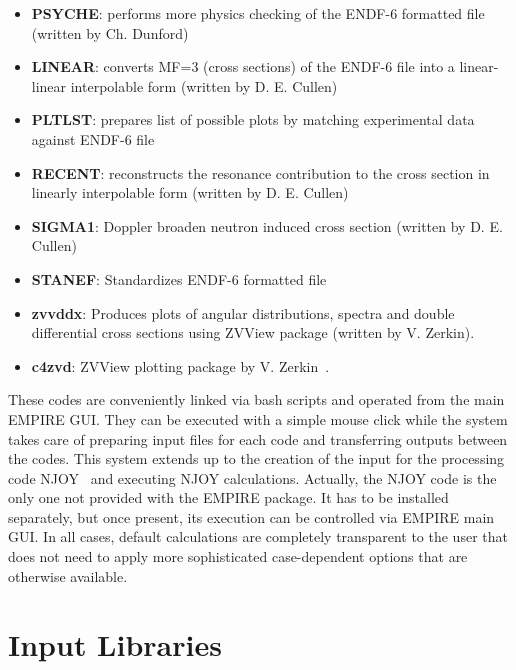 \begin{itemize}
\item \textbf{PSYCHE}: performs more physics checking of the ENDF-6
formatted file (written by Ch. Dunford)

\item \textbf{LINEAR}: converts MF=3 (cross sections) of the ENDF-6 file
into a linear-linear interpolable form (written by D. E. Cullen)~\cite%
{PREPRO}

\item \textbf{PLTLST}: prepares list of possible plots by matching
experimental data against ENDF-6 file

\item \textbf{RECENT}: reconstructs the resonance contribution to the cross
section in linearly interpolable form (written by D. E. Cullen)~\cite{PREPRO}

\item \textbf{SIGMA1}: Doppler broaden neutron induced cross section
(written by D. E. Cullen)~\cite{PREPRO}

\item \textbf{STANEF}: Standardizes ENDF-6 formatted file

\item \textbf{zvvddx}: Produces plots of angular distributions, spectra and
double differential cross sections using ZVView package (written by V.
Zerkin).

\item \textbf{c4zvd}: ZVView\textbf{%
} plotting package by V. Zerkin~\cite{ZVView}.
\end{itemize}

These codes are conveniently linked via bash scripts and operated from the
main EMPIRE GUI. They can be executed with a simple mouse click while the
system takes care of preparing input files for each code and transferring
outputs between the codes. This system extends up to the creation of the
input for the processing code NJOY~\cite{MacFarlane:94} and executing NJOY
calculations. Actually, the NJOY code is the only one not provided with the
EMPIRE package. It has to be installed separately, but once present, its
execution can be controlled via EMPIRE main GUI. In all cases, default
calculations are completely transparent to the user that does not need to
apply more sophisticated case-dependent options that are otherwise available.

\section{Input Libraries}


